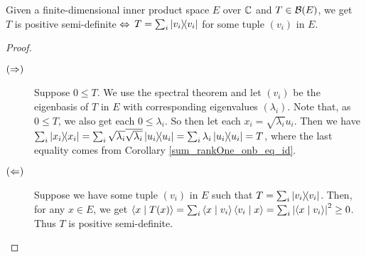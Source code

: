  \begin{lemma}\label{LinearMap.isPositive_iff_eq_sum_rankOne}\leanok
  Given a finite-dimensional inner product space $E$ over $\mathbb{C}$ and $T\in\mathcal{B}(E)$, we get\\
  \hspace*{0.5cm}$T$ is positive semi-definite $\Leftrightarrow$ $T=\sum_i\left\lvert v_i\right\rangle\!\!\left\langle v_i\right\rvert$ for some tuple $(v_i)$ in $E$.
 \end{lemma}
 \begin{proof}\leanok {\ }
 \begin{description}
  \item[$(\Rightarrow)$]
   Suppose $0\leq{T}$. We use the spectral theorem and let $(v_i)$ be the eigenbasis of $T$ in $E$ with corresponding eigenvalues $(\lambda_i)$. Note that, as $0\leq{T}$, we also get each $0\leq\lambda_i$. So then let each $x_i=\sqrt{\lambda_i}u_i$. Then we have $\sum_i\left\lvert x_i\right\rangle\!\!\left\langle x_i\right\rvert=\sum_i\sqrt{\lambda_i}\overline{\sqrt{\lambda_i}}\left\lvert u_i\right\rangle\!\!\left\langle u_i\right\rvert=\sum_i\lambda_i\left\lvert u_i\right\rangle\!\!\left\langle u_i\right\rvert=T$, where the last equality comes from Corollary \ref{sum_rankOne_onb_eq_id}.
  \item[$(\Leftarrow)$]
   Suppose we have some tuple $(v_i)$ in $E$ such that $T=\sum_i\left\lvert v_i\right\rangle\!\!\left\langle v_i\right\rvert$. Then, for any $x\in{E}$, we get
   $\left\langle x \mid T(x)\right\rangle=\sum_i\left\langle x \mid v_i\right\rangle\left\langle v_i \mid x\right\rangle=\sum_i\left\lvert{\left\langle x \mid v_i\right\rangle}\right\rvert^2\geq0$.
   Thus $T$ is positive semi-definite.
 \end{description}
 \end{proof}

